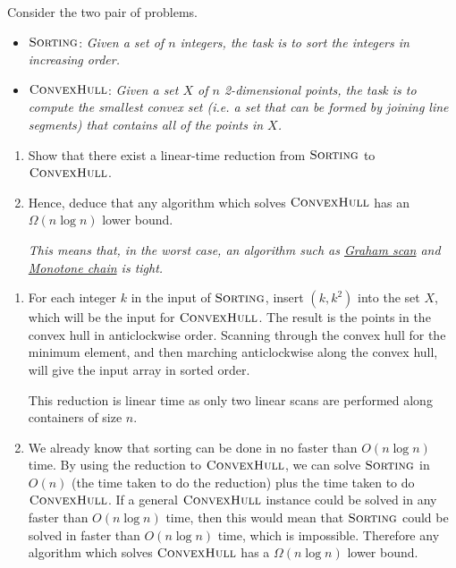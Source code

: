 \documentclass{article}
\begin{document}
\begin{question}
Consider the two pair of problems.
\begin{itemize}
    \item $\mathsf{\textsc{Sorting}}$: {\em Given a set of $n$ integers, the task is to sort the integers in increasing order.}
    \item $\mathsf{\textsc{ConvexHull}}$: {\em Given a set $X$ of $n$ 2-dimensional points, the task is to compute the smallest convex set (i.e. a set that can be formed by joining line segments) that contains all of the points in $X$.}
\end{itemize}

\begin{enumerate}[label = (\alph*)]
    \item Show that there exist a linear-time reduction from $\mathsf{\textsc{Sorting}}$ to $\mathsf{\textsc{ConvexHull}}$.
    \item Hence, deduce that any algorithm which solves $\mathsf{\textsc{ConvexHull}}$ has an $\Omega(n \log n)$ lower bound.

    {\em This means that, in the worst case, an algorithm such as \href{https://en.wikipedia.org/wiki/Graham_scan}{Graham scan} and \href{https://en.wikibooks.org/wiki/Algorithm_Implementation/Geometry/Convex_hull/Monotone_chain}{Monotone chain} is tight.}
\end{enumerate}
\end{question}

\begin{solution}
\begin{enumerate}[label = (\alph*)]
    \item For each integer $k$ in the input of $\mathsf{\textsc{Sorting}}$, 
    insert $(k, k^2)$ into the set $X$, which will be the input for $\mathsf{\textsc{ConvexHull}}$.
    The result is the points in the convex hull in anticlockwise order.
    Scanning through the convex hull for the minimum element, and then marching anticlockwise along the convex hull, 
    will give the input array in sorted order.

    This reduction is linear time as only two linear scans are performed along containers of size $n$.


    \item We already know that sorting can be done in no faster than $O(n\log n)$ time.
    By using the reduction to $\mathsf{\textsc{ConvexHull}}$, we can 
    solve $\mathsf{\textsc{Sorting}}$ in $O(n)$ (the time taken to do the reduction) plus 
    the time taken to do $\mathsf{\textsc{ConvexHull}}$.
    If a general $\mathsf{\textsc{ConvexHull}}$ instance could be solved in any faster than $O(n\log n)$ time, 
    then this would mean that $\mathsf{\textsc{Sorting}}$ could be solved in faster than $O(n\log n)$ time,
    which is impossible. Therefore any algorithm which solves $\mathsf{\textsc{ConvexHull}}$ has a $\Omega(n\log n)$ lower bound.
\end{enumerate}
\end{solution}
\end{document}
